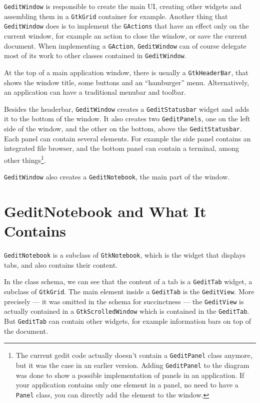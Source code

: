 \lstinline{GeditWindow} is responsible to create the main UI, creating other widgets and assembling them in a \lstinline{GtkGrid} container for example. Another thing that \lstinline{GeditWindow} does is to implement the \lstinline{GActions} that have an effect only on the current window, for example an action to close the window, or save the current document. When implementing a \lstinline{GAction}, \lstinline{GeditWindow} can of course delegate most of its work to other classes contained in \lstinline{GeditWindow}.

At the top of a main application window, there is usually a \lstinline{GtkHeaderBar}, that shows the window title, some buttons and an ``hamburger'' menu. Alternatively, an application can have a traditional menubar and toolbar.

Besides the headerbar, \lstinline{GeditWindow} creates a \lstinline{GeditStatusbar} widget and adds it to the bottom of the window. It also creates two \lstinline{GeditPanels}, one on the left side of the window, and the other on the bottom, above the \lstinline{GeditStatusbar}. Each panel can contain several elements. For example the side panel contains an integrated file browser, and the bottom panel can contain a terminal, among other things\footnote{The current gedit code actually doesn't contain a \lstinline{GeditPanel} class anymore, but it was the case in an earlier version. Adding \lstinline{GeditPanel} to the diagram was done to show a possible implementation of panels in an application. If your application contains only one element in a panel, no need to have a \lstinline{Panel} class, you can directly add the element to the window.}.

\lstinline{GeditWindow} also creates a \lstinline{GeditNotebook}, the main part of the window.

\section{GeditNotebook and What It Contains}

\lstinline{GeditNotebook} is a subclass of \lstinline{GtkNotebook}, which is the widget that displays tabs, and also contains their content.

In the class schema, we can see that the content of a tab is a \lstinline{GeditTab} widget, a subclass of \lstinline{GtkGrid}. The main element inside a \lstinline{GeditTab} is the \lstinline{GeditView}. More precisely --- it was omitted in the schema for succinctness --- the \lstinline{GeditView} is actually contained in a \lstinline{GtkScrolledWindow} which is contained in the \lstinline{GeditTab}. But \lstinline{GeditTab} can contain other widgets, for example information bars on top of the document.


